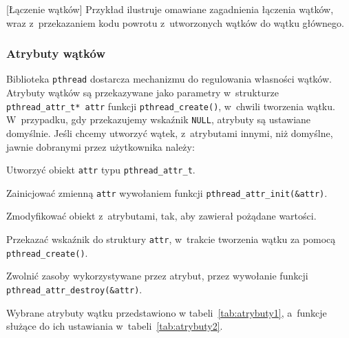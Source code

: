 \begin{example}{[Łączenie wątków]}
Przykład ilustruje omawiane zagadnienia łączenia wątków, wraz z~przekazaniem kodu powrotu z~utworzonych wątków do wątku głównego. 



\end{example} 


\subsubsection{Atrybuty wątków}

Biblioteka \lstinline[style=MyCStyle]{pthread} dostarcza mechanizmu do regulowania własności wątków. Atrybuty wątków są przekazywane jako parametry w~strukturze \lstinline[style=MyCStyle]{pthread_attr_t* attr} funkcji \lstinline[style=MyCStyle]{pthread_create()}, w~chwili tworzenia wątku. W~przypadku, gdy przekazujemy wskaźnik \lstinline[style=MyCStyle]{NULL}, atrybuty są ustawiane domyślnie. Jeśli chcemy utworzyć wątek, z~atrybutami innymi, niż domyślne, jawnie dobranymi przez użytkownika należy:


\begin{myitemize}
\item Utworzyć obiekt \lstinline[style=MyCStyle]{attr} typu \lstinline[style=MyCStyle]{pthread_attr_t}. 
\item Zainicjować zmienną \lstinline[style=MyCStyle]{attr} wywołaniem funkcji \lstinline[style=MyCStyle]{pthread_attr_init(&attr)}.
\item Zmodyfikować obiekt z~atrybutami, tak, aby zawierał pożądane wartości.
\item Przekazać wskaźnik do struktury \lstinline[style=MyCStyle]{attr}, w~trakcie tworzenia wątku za pomocą \lstinline[style=MyCStyle]{pthread_create()}. 
\item Zwolnić zasoby wykorzystywane przez atrybut, przez wywołanie funkcji \mbox{\lstinline[style=MyCStyle]{pthread_attr_destroy(&attr)}}.
\end{myitemize}

Wybrane atrybuty wątku przedstawiono w tabeli~\ref{tab:atrybuty1}, a~funkcje służące do ich ustawiania w~tabeli~\ref{tab:atrybuty2}.

